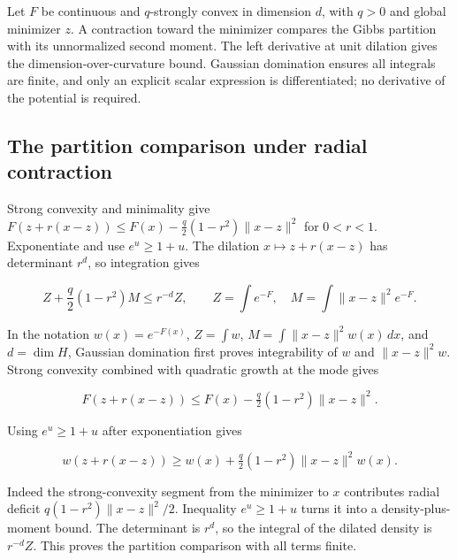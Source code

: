 \documentclass[11pt,a4paper]{report}
\begin{document}
Let \(F\) be continuous and \(q\)-strongly convex in dimension \(d\), with \(q>0\) and global minimizer \(z\). A contraction toward the minimizer compares the Gibbs partition with its unnormalized second moment. The left derivative at unit dilation gives the dimension-over-curvature bound. Gaussian domination ensures all integrals are finite, and only an explicit scalar expression is differentiated; no derivative of the potential is required.

\subsection{\texorpdfstring{The partition comparison under radial contraction}{The partition comparison under radial contraction}}
\label{report-step-ProximalLangevin-SharpConcentration-lean-1}


Strong convexity and minimality give \(F(z+r(x-z))\le F(x)-\frac q2(1-r^2)\|x-z\|^2\) for \(0<r<1\). Exponentiate and use \(e^u\ge1+u\). The dilation \(x\mapsto z+r(x-z)\) has determinant \(r^d\), so integration gives

\[Z+\frac q2(1-r^2)M\le r^{-d}Z,\qquad Z=\int e^{-F},\quad M=\int\|x-z\|^2e^{-F}.\]

In the notation \(w(x)=e^{-F(x)}\), \(Z=\int w\), \(M=\int\|x-z\|^2w(x)\,dx\), and \(d=\dim H\), Gaussian domination first proves integrability of \(w\) and \(\|x-z\|^2w\). Strong convexity combined with quadratic growth at the mode gives

\[F(z+r(x-z))\le F(x)-\tfrac q2(1-r^2)\|x-z\|^2.\]

Using \(e^u\ge1+u\) after exponentiation gives

\[w(z+r(x-z))\ge w(x)+\tfrac q2(1-r^2)\|x-z\|^2w(x).\]

Indeed the strong-convexity segment from the minimizer to \(x\) contributes radial deficit \(q(1-r^2)\|x-z\|^2/2\). Inequality \(e^u\ge1+u\) turns it into a density-plus-moment bound. The determinant is \(r^d\), so the integral of the dilated density is \(r^{-d}Z\). This proves the partition comparison with all terms finite.
\end{document}
